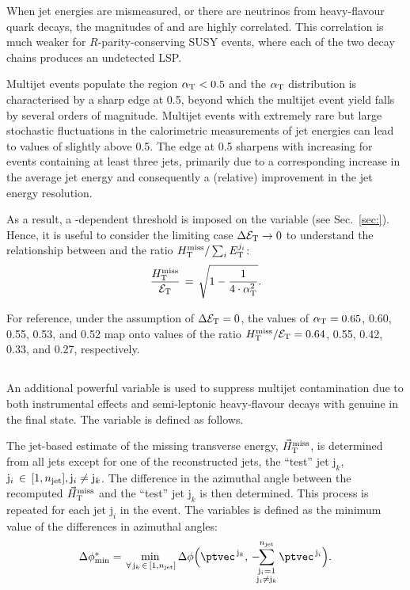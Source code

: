 When jet energies are mismeasured, or there are neutrinos from
heavy-flavour quark decays, the magnitudes of \HTmiss and \dst are
highly correlated. This correlation is much weaker for
$R$-parity-conserving SUSY events, where each of the two decay chains
produces an undetected LSP.

Multijet events populate the region $\alpha_{\text{T}}< 0.5$ and the $\alpha_{\text{T}}$
distribution is characterised by a sharp edge at 0.5, beyond which the
multijet event yield falls by several orders of magnitude. Multijet
events with extremely rare but large stochastic fluctuations in the
calorimetric measurements of jet energies can lead to values of
\alphat slightly above 0.5. The edge at 0.5 sharpens with increasing
\scalht for events containing at least three jets, primarily due to a
corresponding increase in the average jet energy and consequently a
(relative) improvement in the jet energy resolution.

As a result, a \scalht-dependent threshold is imposed on the \alphat
variable (see Sec.~\ref{sec:}). Hence, it is useful to consider the
limiting case $\Delta\mathcal{E}_\mathrm{T} \rightarrow 0$ to understand the relationship
between \alphat and the ratio $\mbox{$H_{\rm T}^{\rm miss}$}/\sum_{i} E_\textrm{T}^{j_i}$:
\begin{equation}
  \label{eq:alphat3}
  \frac{\mbox{$H_{\rm T}^{\rm miss}$}}{\mathcal{E}_\mathrm{T}} \, = \, \sqrt{ 1 - \frac{1}{4 \cdot \alpha_{\text{T}}^2} }.
\end{equation}

For reference, under the assumption of $\Delta\mathcal{E}_\mathrm{T} = 0$, the values of
$\alpha_{\text{T}} = 0.65$, 0.60, 0.55, 0.53, and 0.52 map onto values of the
ratio $\mbox{$H_{\rm T}^{\rm miss}$}/\mathcal{E}_\mathrm{T} = 0.64$, 0.55, 0.42, 0.33, and 0.27, respectively.

\subsection{\texorpdfstring{\bdphi}{biased dPhi}}
\label{sec:bdphi-def}

An additional powerful variable \bdphi is used to suppress multijet
contamination due to both instrumental effects and semi-leptonic
heavy-flavour decays with genuine \met in the final state. The
variable is defined as follows.

The jet-based estimate of the missing transverse energy, ${\mbox{$\vec{H}_{\rm T}^{\rm miss}$}}$,
is determined from all jets except for one of the reconstructed jets,
the ``test'' jet $\mathrm{j}_k$, \ie $\mathrm{j}_i \,\in\, [1,n_{\text{jet}}],
\mathrm{j}_i \ne \mathrm{j}_k$. The difference in the azimuthal angle
between the recomputed $\mbox{$\vec{H}_{\rm T}^{\rm miss}$}$ and the ``test'' jet $\mathrm{j}_k$
is then determined. This process is repeated for each jet
$\mathrm{j}_i$ in the event. The \bdphi variables is defined as the
minimum value of the differences in azimuthal angles:
\begin{equation}
  \bdphi = \min_{\,\forall\, \mathrm{j}_k\,\in\, [1,\njet]}
  \Delta\phi \Bigl( \ptvec^{\,\mathrm{j}_k}, \,
    -\hspace{-0.5em}\sum_{\substack{\mathrm{j}_i= 1 \\ \mathrm{j}_i \ne \mathrm{j}_k}}^{\njet}
    \ptvec^{\,\mathrm{j}_i} \Bigr).
  \label{eq:bdphi}
\end{equation}

